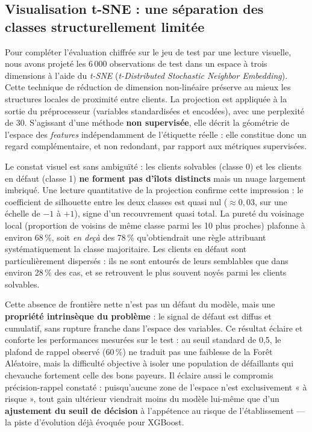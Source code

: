 \documentclass{article}
\begin{document}
\subsection{Visualisation t-SNE : une séparation des classes structurellement limitée}

Pour compléter l'évaluation chiffrée sur le jeu de test par une lecture visuelle, nous avons projeté les 6\,000 observations de test dans un espace à trois dimensions à l'aide du \textit{t-SNE} (\textit{t-Distributed Stochastic Neighbor Embedding}). Cette technique de réduction de dimension non-linéaire préserve au mieux les structures locales de proximité entre clients. La projection est appliquée à la sortie du préprocesseur (variables standardisées et encodées), avec une perplexité de 30. S'agissant d'une méthode \textbf{non supervisée}, elle décrit la géométrie de l'espace des \textit{features} indépendamment de l'étiquette réelle : elle constitue donc un regard complémentaire, et non redondant, par rapport aux métriques supervisées.

Le constat visuel est sans ambiguïté : les clients solvables (classe 0) et les clients en défaut (classe 1) \textbf{ne forment pas d'îlots distincts} mais un nuage largement imbriqué. Une lecture quantitative de la projection confirme cette impression : le coefficient de silhouette entre les deux classes est quasi nul ($\approx 0{,}03$, sur une échelle de $-1$ à $+1$), signe d'un recouvrement quasi total. La pureté du voisinage local (proportion de voisins de même classe parmi les 10 plus proches) plafonne à environ 68\,\%, soit \emph{en deçà} des 78\,\% qu'obtiendrait une règle attribuant systématiquement la classe majoritaire. Les clients en défaut sont particulièrement dispersés : ils ne sont entourés de leurs semblables que dans environ 28\,\% des cas, et se retrouvent le plus souvent noyés parmi les clients solvables.

Cette absence de frontière nette n'est pas un défaut du modèle, mais une \textbf{propriété intrinsèque du problème} : le signal de défaut est diffus et cumulatif, sans rupture franche dans l'espace des variables. Ce résultat éclaire et conforte les performances mesurées sur le test : au seuil standard de 0,5, le plafond de rappel observé (60\,\%) ne traduit pas une faiblesse de la Forêt Aléatoire, mais la difficulté objective à isoler une population de défaillants qui chevauche fortement celle des bons payeurs. Il éclaire aussi le compromis précision-rappel constaté : puisqu'aucune zone de l'espace n'est exclusivement « à risque », tout gain ultérieur viendrait moins du modèle lui-même que d'un \textbf{ajustement du seuil de décision} à l'appétence au risque de l'établissement — la piste d'évolution déjà évoquée pour XGBoost.
\end{document}
